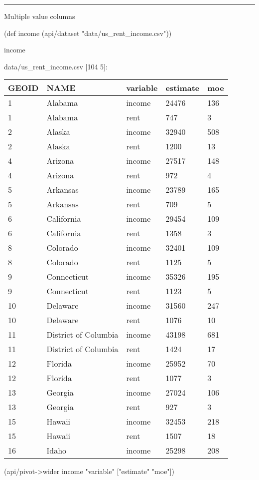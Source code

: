 \documentclass[]{article}
\newenvironment{Shaded}{\begin{snugshade}}{\end{snugshade}}
\newcommand{\StringTok}[1]{\textcolor[rgb]{0.31,0.60,0.02}{#1}}
\newcommand{\FunctionTok}[1]{\textcolor[rgb]{0.00,0.00,0.00}{#1}}
\newcommand{\BuiltInTok}[1]{#1}
\newcommand{\NormalTok}[1]{#1}
\begin{document}
\begin{center}\rule{0.5\linewidth}{0.5pt}\end{center}

Multiple value columns

\begin{Shaded}
\begin{Highlighting}[]
\NormalTok{(}\BuiltInTok{def}\FunctionTok{ income }\NormalTok{(api/dataset }\StringTok{"data/us_rent_income.csv"}\NormalTok{))}
\end{Highlighting}
\end{Shaded}

\begin{Shaded}
\begin{Highlighting}[]
\NormalTok{income}
\end{Highlighting}
\end{Shaded}

data/us\_rent\_income.csv {[}104 5{]}:

\begin{longtable}[]{@{}lllll@{}}
\toprule
GEOID & NAME & variable & estimate & moe\tabularnewline
\midrule
\endhead
1 & Alabama & income & 24476 & 136\tabularnewline
1 & Alabama & rent & 747 & 3\tabularnewline
2 & Alaska & income & 32940 & 508\tabularnewline
2 & Alaska & rent & 1200 & 13\tabularnewline
4 & Arizona & income & 27517 & 148\tabularnewline
4 & Arizona & rent & 972 & 4\tabularnewline
5 & Arkansas & income & 23789 & 165\tabularnewline
5 & Arkansas & rent & 709 & 5\tabularnewline
6 & California & income & 29454 & 109\tabularnewline
6 & California & rent & 1358 & 3\tabularnewline
8 & Colorado & income & 32401 & 109\tabularnewline
8 & Colorado & rent & 1125 & 5\tabularnewline
9 & Connecticut & income & 35326 & 195\tabularnewline
9 & Connecticut & rent & 1123 & 5\tabularnewline
10 & Delaware & income & 31560 & 247\tabularnewline
10 & Delaware & rent & 1076 & 10\tabularnewline
11 & District of Columbia & income & 43198 & 681\tabularnewline
11 & District of Columbia & rent & 1424 & 17\tabularnewline
12 & Florida & income & 25952 & 70\tabularnewline
12 & Florida & rent & 1077 & 3\tabularnewline
13 & Georgia & income & 27024 & 106\tabularnewline
13 & Georgia & rent & 927 & 3\tabularnewline
15 & Hawaii & income & 32453 & 218\tabularnewline
15 & Hawaii & rent & 1507 & 18\tabularnewline
16 & Idaho & income & 25298 & 208\tabularnewline
\bottomrule
\end{longtable}

\begin{Shaded}
\begin{Highlighting}[]
\NormalTok{(api/pivot->wider income }\StringTok{"variable"}\NormalTok{ [}\StringTok{"estimate"} \StringTok{"moe"}\NormalTok{])}
\end{Highlighting}
\end{Shaded}
\end{document}
